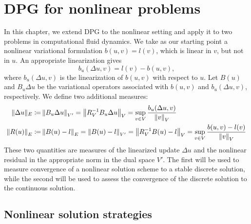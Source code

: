 \section{DPG for nonlinear problems}

In this chapter, we extend DPG to the nonlinear setting and apply it to two problems in computational fluid dynamics.  We take as our starting point a nonlinear variational formulation
$b(u,v) = l(v)$, which is linear in $v$, but not in $u$.  An appropriate linearization gives
\[
b_u(\Delta u,v) = l(v) - b(u,v),
\]
where $b_u(\Delta u,v)$ is the linearization of $b(u,v)$ with respect to $u$.  Let $B(u)$ and $B_u\Delta u$ be the variational operators associated with $b(u,v)$ and $b_u(\Delta u,v)$, respectively.  We define two additional measures: 
\begin{align*}
\|\Delta u\|_E \coloneqq & \nor{B_u\Delta u}_{V'} = \nor{R_V^{-1} B_u\Delta u}_V = \sup_{v\in V} \frac{b_u(\Delta u,v)}{\nor{v}_V}\\
\nor{R(u)}_E \coloneqq & \nor{B(u)-l}_E = \nor{B(u) - l}_{V'}  = \nor{R_V^{-1} B(u)-l}_V = \sup_{v\in V} \frac{b(u,v)-l(v)}{\nor{v}_V}
\end{align*}
These two quantities are measures of the linearized update $\Delta u$ and the nonlinear residual in the appropriate norm in the dual space $V'$.  The first will be used to measure convergence of a nonlinear solution scheme to a stable discrete solution, while the second will be used to assess the convergence of the discrete solution to the continuous solution.  

\subsection{Nonlinear solution strategies}

